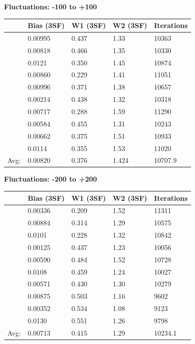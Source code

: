 \documentclass{article}
\begin{document}
\begin{center}
    \textbf{Fluctuations: -100 to +100}        \\
    \begin{tabular}{ r | l | l | l | l }
        \hline
        & Bias (3SF) & W1 (3SF) & W2 (3SF) & Iterations \\
        \hline
 & 0.00995& 0.437& 1.33& 10363 \\
 & 0.00818& 0.466& 1.35& 10330 \\
 & 0.0121& 0.350& 1.45& 10874 \\
 & 0.00860& 0.229& 1.41& 11051 \\
 & 0.00996& 0.371& 1.38& 10657 \\
 & 0.00214& 0.438& 1.32& 10318 \\
 & 0.00717& 0.288& 1.59& 11290 \\
 & 0.00584& 0.455& 1.31& 10243 \\
 & 0.00662& 0.375& 1.51& 10933 \\
 & 0.0114& 0.355& 1.53& 11020 \\
        \hline
Avg: & 0.00820& 0.376& 1.424& 10707.9 \\
        \hline
    \end{tabular}
\end{center}

\begin{center}
    \textbf{Fluctuations: -200 to +200}        \\
    \begin{tabular}{ r | l | l | l | l }
        \hline
        & Bias (3SF) & W1 (3SF) & W2 (3SF) & Iterations \\
        \hline
& 0.00336& 0.209& 1.52& 11311 \\
& 0.00884& 0.314& 1.29& 10575 \\
& 0.0101& 0.228& 1.32& 10842 \\
& 0.00125& 0.437& 1.23& 10056 \\
& 0.00590& 0.484& 1.52& 10728 \\
& 0.0108& 0.459& 1.24& 10027 \\
& 0.00571& 0.430& 1.30& 10279 \\
& 0.00875& 0.503& 1.16& 9602 \\
& 0.00352& 0.534& 1.08& 9123 \\
& 0.0130& 0.551& 1.26& 9798 \\
        \hline
        Avg: & 0.00713& 0.415& 1.29& 10234.1\\
        \hline
    \end{tabular}
\end{center}
\end{document}

